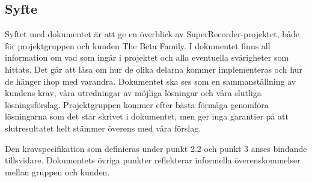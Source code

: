 \subsection{Syfte}

Syftet med dokumentet är att ge en överblick av SuperRecorder-projektet, både för projektgruppen och kunden The Beta Family. I dokumentet finns all information om vad som ingår i projektet och alla eventuella svårigheter som hittats. Det går att läsa om hur de olika delarna kommer implementeras och hur de hänger ihop med varandra. Dokumentet ska ses som en sammanställning av kundens krav, våra utredningar av möjliga lösningar och våra slutliga lösningsförslag. Projektgruppen kommer efter bästa förmåga genomföra lösningarna som det står skrivet i dokumentet, men ger inga garantier på att slutresultatet helt stämmer överens med våra förslag.

Den kravspecifikation som definieras under punkt 2.2 och punkt 3 anses bindande tillsvidare. Dokumentets övriga punkter reflekterar informella överenskommelser mellan gruppen och kunden.